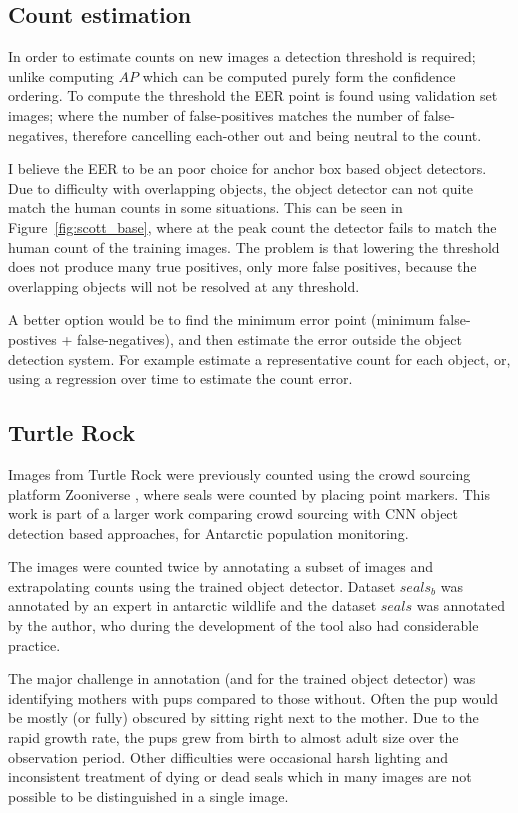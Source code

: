 \subsection {Count estimation}

In order to estimate counts on new images a detection threshold is required;  unlike computing $AP$ which can be computed purely form the confidence ordering. To  compute the threshold the \gls{EER} point is found using validation set images; where the number of false-positives matches the number of false-negatives, therefore cancelling each-other out and being neutral to the count.

I believe the \gls{EER} to be an poor choice for anchor box based object detectors. Due to difficulty with overlapping objects, the object detector can not quite match the human counts in some situations. This can be seen in Figure~\ref{fig:scott_base}, where at the peak count the detector fails to match the human count of the training images. The problem is that lowering the threshold does not produce many true positives, only more false positives, because the overlapping objects will not be resolved at any threshold.

A better option would be to find the minimum error point (minimum false-postives + false-negatives), and then estimate the error outside the object detection system. For example estimate a representative count for each object, or, using a regression over time to estimate the count error.

\subsection{Turtle Rock \texorpdfstring{\cite{Eisert2015}}{}}
 
 Images from Turtle Rock were previously counted using the crowd sourcing platform Zooniverse \cite{Zooniverse}, where seals were counted by placing point markers. This work is part of a larger work comparing crowd sourcing with \gls{CNN} object detection based approaches, for Antarctic population monitoring. 
 
 The images were counted twice by annotating a subset of images and extrapolating counts using the trained object detector. Dataset $seals_b$ was annotated by an expert in antarctic wildlife and the dataset $seals$ was annotated by the author, who during the development of the tool also had considerable practice. 
 
 The major challenge in annotation (and for the trained object detector) was identifying mothers with pups compared to those without. Often the pup would be mostly (or fully) obscured by sitting right next to the mother.  Due to the rapid growth rate, the pups grew from birth to almost adult size over the observation period. Other difficulties were occasional harsh lighting and inconsistent treatment of dying or dead seals which in many images are not possible to be distinguished in a single image.
 
